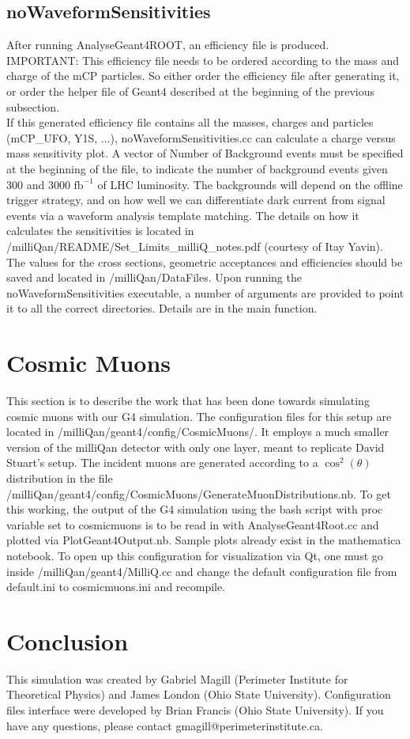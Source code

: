 \documentclass[prd,noshowpacs,nofootinbib,amsmath,amssymb,superscriptaddress]{revtex4}
\begin{document}
\subsection{noWaveformSensitivities} 
After running AnalyseGeant4ROOT, an efficiency file is produced. \\
IMPORTANT: This efficiency file needs to be ordered according to the mass and charge of the mCP particles. So either order the efficiency file after generating it, or order the helper file of Geant4 described at the beginning of the previous subsection.\\
If this generated efficiency file contains all the masses, charges and particles (mCP\_UFO, Y1S, ...), noWaveformSensitivities.cc can calculate a charge versus mass sensitivity plot. A vector of Number of Background events must be specified at the beginning of the file, to indicate the number of background events given 300 and 3000 $\text{fb}^{-1}$ of LHC luminosity. The backgrounds will depend on the offline trigger strategy, and on how well we can differentiate dark current from signal events via a waveform analysis template matching. The details on how it calculates the sensitivities is located in /milliQan/README/Set\_Limits\_milliQ\_notes.pdf (courtesy of Itay Yavin). The values for the cross sections, geometric acceptances and efficiencies should be saved and located in /milliQan/DataFiles. Upon running the noWaveformSensitivities executable, a number of arguments are provided to point it to all the correct directories. Details are in the main function. 

\section{Cosmic Muons}
This section is to describe the work that has been done towards simulating cosmic muons with our G4 simulation. The configuration files for this setup are located in /milliQan/geant4/config/CosmicMuons/. It employs a much smaller version of the milliQan detector with only one layer, meant to replicate David Stuart's setup. The incident muons are generated according to a $\cos^2(\theta)$ distribution in the file /milliQan/geant4/config/CosmicMuons/GenerateMuonDistributions.nb. To get this working, the output of the G4 simulation using the bash script with proc variable set to cosmicmuons is to be read in with AnalyseGeant4Root.cc and plotted via PlotGeant4Output.nb. Sample plots already exist in the mathematica notebook. To open up this configuration for visualization via Qt, one must go inside /milliQan/geant4/MilliQ.cc and change the default configuration file from default.ini to cosmicmuons.ini and recompile. 



\section{Conclusion}
This simulation was created by Gabriel Magill (Perimeter Institute for Theoretical Physics) and James London (Ohio State University). Configuration files interface were developed by Brian Francis (Ohio State University). If you have any questions, please contact gmagill@perimeterinstitute.ca.
\end{document}

